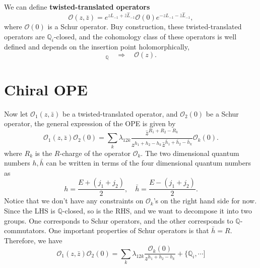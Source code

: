 \documentclass[a4paper,11pt]{article}
\begin{document}
We can define \textbf{twisted-translated operators}
\begin{equation}
    \mathcal{O}(z, \bar{z}) = e^{zL_{-1} + \bar{z} \widehat{L}_{-1}} \mathcal{O}(0) e^{-z L_{-1} - \bar{z} \widehat{L}_{-1}},
\end{equation}
where $\mathcal{O}(0)$ is a Schur operator. Buy construction, these twisted-translated operators are $\mathbb{Q}_i$-closed, and the cohomology class of these operators is well defined and depends on the insertion point holomorphically,
\begin{equation}
    [\mathcal{O}(z, \bar{z})]_{\mathbb{Q}} \quad \Rightarrow \quad \mathcal{O}(z).
\end{equation}

\section{Chiral OPE}
Now let $\mathcal{O}_1(z, \bar{z})$ be a twisted-translated operator, and $\mathcal{O}_2(0)$ be a Schur operator, the general expression of the OPE is given by
\begin{equation}
    \mathcal{O}_1(z, \bar{z}) \mathcal{O}_2(0) = \sum_k \lambda_{12k} \frac{\bar{z}^{R_1 + R_2 - R_k}}{z^{h_1 + h_2 - h_k} \bar{z}^{\bar{h}_1 + \bar{h}_2 - \bar{h}_k}}\mathcal{O}_k(0).
\end{equation}
where $R_k$ is the $R$-charge of the operator $\mathcal{O}_k$. The two dimensional quantum numbers $h, \bar{h}$ can be written in terms of the four dimensional quantum numbers as
\begin{equation}
    h = \frac{E + (j_1 + j_2)}{2}, \quad \bar{h} = \frac{E - (j_1 + j_2)}{2}.
\end{equation}
Notice that we don't have any constraints on $\mathcal{O}_k$'s on the right hand side for now. Since the LHS is $\mathbb{Q}$-closed, so is the RHS, and we want to decompose it into two groups. One corresponds to Schur operators, and the other corresponds to $\mathbb{Q}$-commutators. One important properties of Schur operators is that $\bar{h} = R$. Therefore, we have
\begin{equation}
    \mathcal{O}_1(z, \bar{z}) \mathcal{O}_2(0) = \sum_k \lambda_{12k} \frac{\mathcal{O}_k(0)}{z^{h_1 + h_2 - h_k}} + \{ \mathbb{Q}_i, \cdots ]
\end{equation}
\end{document}
